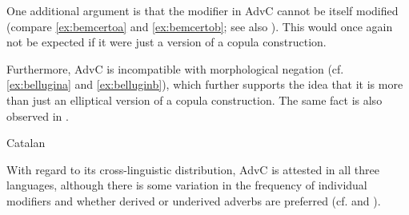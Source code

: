 One additional argument is that the modifier in AdvC cannot be itself modified (compare \eqref{ex:bemcertoa} and \eqref{ex:bemcertob}; see also \citealt{Cruschina2017a, Cruschina2018}). This would once again not be expected if it were just a version of a copula construction. 
 
\z
	\z

Furthermore, AdvC is incompatible with morphological negation (cf. \ref{ex:bellugina} and \ref{ex:belluginb}), which further supports the idea that  it is more than just an elliptical version of a copula construction. The same fact is also observed in \citet{Cruschina2017a, Cruschina2018}.  

 \ea Catalan
\z 
 \z



With regard to its cross-linguistic distribution, AdvC is  attested in all three languages, although there is some variation in the frequency of individual modifiers and whether derived or underived adverbs are preferred (cf. \citealt{Kocher2014, Kocher2017} and ). 

